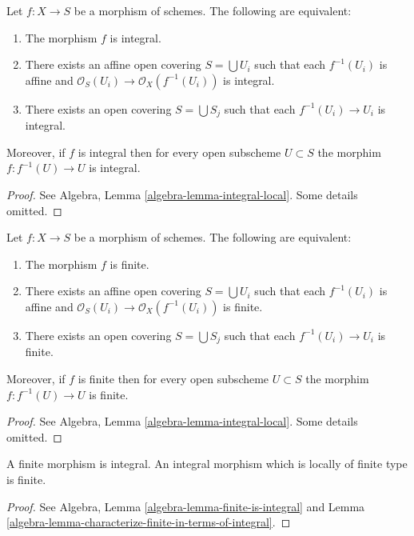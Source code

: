 \begin{lemma}
\label{lemma-integral-local}
Let $f : X \to S$ be a morphism of schemes.
The following are equivalent:
\begin{enumerate}
\item The morphism $f$ is integral.
\item There exists an affine open covering $S = \bigcup U_i$ such that
each $f^{-1}(U_i)$ is affine and
$\mathcal{O}_S(U_i) \to \mathcal{O}_X(f^{-1}(U_i))$ is integral.
\item There exists an open covering $S = \bigcup S_j$
such that each $f^{-1}(U_i) \to U_i$ is integral.
\end{enumerate}
Moreover, if $f$ is integral then for every open subscheme
$U \subset S$ the morphim $f : f^{-1}(U) \to U$ is integral.
\end{lemma}

\begin{proof}
See Algebra, Lemma \ref{algebra-lemma-integral-local}.
Some details omitted.
\end{proof}

\begin{lemma}
\label{lemma-finite-local}
Let $f : X \to S$ be a morphism of schemes.
The following are equivalent:
\begin{enumerate}
\item The morphism $f$ is finite.
\item There exists an affine open covering $S = \bigcup U_i$ such that
each $f^{-1}(U_i)$ is affine and
$\mathcal{O}_S(U_i) \to \mathcal{O}_X(f^{-1}(U_i))$ is finite.
\item There exists an open covering $S = \bigcup S_j$
such that each $f^{-1}(U_i) \to U_i$ is finite.
\end{enumerate}
Moreover, if $f$ is finite then for every open subscheme
$U \subset S$ the morphim $f : f^{-1}(U) \to U$ is finite.
\end{lemma}

\begin{proof}
See Algebra, Lemma \ref{algebra-lemma-integral-local}.
Some details omitted.
\end{proof}

\begin{lemma}
\label{lemma-finite-integral}
A finite morphism is integral.
An integral morphism which is locally of finite type is finite.
\end{lemma}

\begin{proof}
See Algebra, Lemma \ref{algebra-lemma-finite-is-integral}
and Lemma \ref{algebra-lemma-characterize-finite-in-terms-of-integral}.
\end{proof}

